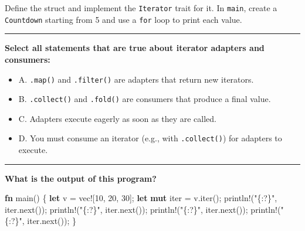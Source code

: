 \documentclass[
  11pt,
]{article}
\newenvironment{Shaded}{}{}
\newcommand{\DecValTok}[1]{\textcolor[rgb]{0.25,0.63,0.44}{#1}}
\newcommand{\KeywordTok}[1]{\textcolor[rgb]{0.00,0.44,0.13}{\textbf{#1}}}
\newcommand{\NormalTok}[1]{#1}
\newcommand{\OperatorTok}[1]{\textcolor[rgb]{0.40,0.40,0.40}{#1}}
\newcommand{\PreprocessorTok}[1]{\textcolor[rgb]{0.74,0.48,0.00}{#1}}
\newcommand{\StringTok}[1]{\textcolor[rgb]{0.25,0.44,0.63}{#1}}
\providecommand{\tightlist}{%
  \setlength{\itemsep}{0pt}\setlength{\parskip}{0pt}}
\begin{document}
Define the struct and implement the \texttt{Iterator} trait for it. In
\texttt{main}, create a \texttt{Countdown} starting from 5 and use a
\texttt{for} loop to print each value.

\begin{Shaded}
\begin{Highlighting}[]

\end{Highlighting}
\end{Shaded}

\begin{center}\rule{0.5\linewidth}{0.5pt}\end{center}

\textbf{Select all statements that are true about iterator adapters and
consumers:}

\begin{itemize}
\tightlist
\item[$\square$]
  A. \texttt{.map()} and \texttt{.filter()} are adapters that return new
  iterators.
\item[$\square$]
  B. \texttt{.collect()} and \texttt{.fold()} are consumers that produce
  a final value.
\item[$\square$]
  C. Adapters execute eagerly as soon as they are called.
\item[$\square$]
  D. You must consume an iterator (e.g., with \texttt{.collect()}) for
  adapters to execute.
\end{itemize}

\begin{center}\rule{0.5\linewidth}{0.5pt}\end{center}

\textbf{What is the output of this program?}

\begin{Shaded}
\begin{Highlighting}[]
\KeywordTok{fn}\NormalTok{ main() }\OperatorTok{\{}
    \KeywordTok{let}\NormalTok{ v }\OperatorTok{=} \PreprocessorTok{vec!}\NormalTok{[}\DecValTok{10}\OperatorTok{,} \DecValTok{20}\OperatorTok{,} \DecValTok{30}\NormalTok{]}\OperatorTok{;}
    \KeywordTok{let} \KeywordTok{mut}\NormalTok{ iter }\OperatorTok{=}\NormalTok{ v}\OperatorTok{.}\NormalTok{iter()}\OperatorTok{;}
    \PreprocessorTok{println!}\NormalTok{(}\StringTok{"\{:?\}"}\OperatorTok{,}\NormalTok{ iter}\OperatorTok{.}\NormalTok{next())}\OperatorTok{;}
    \PreprocessorTok{println!}\NormalTok{(}\StringTok{"\{:?\}"}\OperatorTok{,}\NormalTok{ iter}\OperatorTok{.}\NormalTok{next())}\OperatorTok{;}
    \PreprocessorTok{println!}\NormalTok{(}\StringTok{"\{:?\}"}\OperatorTok{,}\NormalTok{ iter}\OperatorTok{.}\NormalTok{next())}\OperatorTok{;}
    \PreprocessorTok{println!}\NormalTok{(}\StringTok{"\{:?\}"}\OperatorTok{,}\NormalTok{ iter}\OperatorTok{.}\NormalTok{next())}\OperatorTok{;}
\OperatorTok{\}}
\end{Highlighting}
\end{Shaded}
\end{document}
